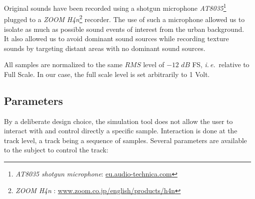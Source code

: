 \documentclass[12pt]{elsarticle}
\newcommand{\ie}{\emph{i.\,e.}}
\begin{document}

Original sounds have been recorded using a shotgun microphone \emph{AT8035}\footnote{\emph{AT8035 shotgun microphone}: \url{eu.audio-technica.com}} plugged to a \emph{ZOOM H4n}\footnote{\emph{ZOOM H4n} : \url{www.zoom.co.jp/english/products/h4n}} recorder. The use of such a microphone allowed us to isolate as much as possible sound events of interest from the urban background. It also allowed us to avoid dominant sound sources while recording texture sounds by targeting distant areas with no dominant sound sources.


All samples are normalized to the same $RMS$ level of $-12$ $dB$ FS, \ie~relative to Full Scale. In our case, the full scale level is set arbitrarily to 1 Volt.

\subsection{Parameters}
\label{sec:simscene_parametre}


By a deliberate design choice, the simulation tool does not allow the user to interact with and control directly a specific sample. Interaction is done at the track level, a track being a sequence of samples. Several parameters are available to the subject to control the track:

\end{document}
